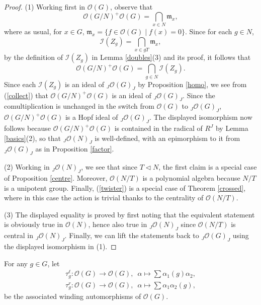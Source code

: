 \documentclass{amsart}
\numberwithin{equation}{section}
\theoremstyle{definition}
\begin{document}
\begin{proof}
(1) Working first in $\mathcal{O}(G)$, observe that 
$$\mathcal{O}(G/N)^+ \mathcal{O}(G)=\bigcap_{x \in N}\mathfrak{m}_x,$$
where as usual, for $x \in G$, $\mathfrak{m}_x = \{f \in \mathcal{O}(G)\mid f(x) = 0 \}$. Since for  each $g \in N$,
$$ \mathcal{I}(Z_g) = \bigcap_{x \in gT} \mathfrak{m}_x,$$
by the definition of $\mathcal{I}(Z_g)$ in Lemma \ref{doubles}(3) and its proof, it follows that 
\begin{equation}\label{collect}
\mathcal{O}(G/N)^+ \mathcal{O}(G)=\bigcap_{g \in N}\mathcal{I}(Z_g).
\end{equation}
Since each $\mathcal{I}(Z_g)$ is an ideal of ${}_J\mathcal{O}(G)_J$ by Proposition \ref{homo}, we see from (\ref{collect}) that $\mathcal{O}(G/N)^+ \mathcal{O}(G)$ is an ideal of ${}_J\mathcal{O}(G)_J$. Since the comultiplication is unchanged in the switch from $\mathcal{O}(G)$ to ${}_J\mathcal{O}(G)_J$, $\mathcal{O}(G/N)^+ \mathcal{O}(G)$ is a Hopf ideal of ${}_J\mathcal{O}(G)_J$. The displayed isomorphism now follows because $\mathcal{O}(G/N)^+\mathcal{O}(G)$ is contained in the radical of $R^J$ by Lemma \ref{basics}(2), so that ${}_J\mathcal{O}(N)_J$ is well-defined, with an epimorphism to it from ${}_J\mathcal{O}(G)_J$ as in Proposition \ref{factor}.

(2) Working in ${}_J\mathcal{O}(N)_J$, we see that since $T \triangleleft N$, the first claim is a special case of Proposition \ref{centre}. Moreover, $\mathcal{O}(N/T)$ is a polynomial algebra because $N/T$ is a unipotent group. Finally, (\ref{twister}) is a special case of Theorem \ref{crossed}, where in this case the action is trivial thanks to the centrality of $\mathcal{O}(N/T)$.

(3) The displayed equality is proved by first noting that the equivalent statement is obviously true in $\mathcal{O}(N)$, hence also true in ${}_J\mathcal{O}(N)_J$ since $\mathcal{O}(N/T)$ is central in ${}_J\mathcal{O}(N)_J$. Finally, we can lift the statements back to ${}_J\mathcal{O}(G)_J$ using the displayed isomorphism in (1). 
\end{proof}

For any $g\in G$, let 
\begin{equation}\label{windaut}
\begin{split}
\tau^{\ell}_g :\mathcal{O}(G)\rightarrow \mathcal{O}(G),\,\,\,\alpha \mapsto \sum \alpha_1(g)\alpha_2,\\
\tau^{r}_g :\mathcal{O}(G)\rightarrow \mathcal{O}(G),\,\,\,\alpha \mapsto \sum \alpha_1\alpha_2(g),
\end{split}
\end{equation}
be the associated winding automorphisms of $\mathcal{O}(G)$.
\end{document}
